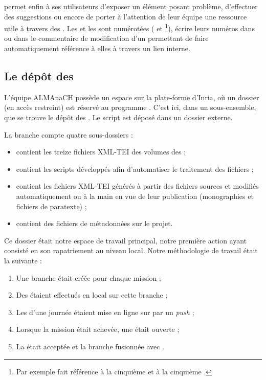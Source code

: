 \gitlab{} permet enfin à ses utilisateurs d'exposer un élément posant problème, d'effectuer des suggestions ou encore de porter à l'attention de leur équipe une ressource utile à travers des \issues. Les \issues{} et les \mergerequests{} sont numérotées ( et \footnote{Par exemple  fait référence à la cinquième \issue{} et  à la cinquième \mergerequest{}.}), écrire leurs numéros dans \gitlab{} ou dans le commentaire de modification d'un \commit{} permettant de faire automatiquement référence à elles à travers un lien interne.

\subsection{Le dépôt \gitlab{} des \odm}

L'équipe ALMAnaCH possède un espace sur la plate-forme \gitlab{} d'Inria, où un dossier (en accès restreint) est réservé au programme \timeus{}. C'est ici, dans un sous-ensemble, que se trouve le dépôt des \odm. Le script \lse{} est déposé dans un dossier externe.

La branche \master{} compte quatre sous-dossiers :

\begin{itemize}
    \item {} contient les treize fichiers XML-TEI des volumes des \odm{} ;
    \item {} contient les scripts développés afin d'automatiser le traitement des fichiers ;
    \item {} contient les fichiers XML-TEI générés à partir des fichiers sources et modifiés automatiquement ou à la main en vue de leur publication (monographies et fichiers de paratexte) ;
    \item {} contient des fichiers de métadonnées sur le projet.
\end{itemize}

Ce dossier était notre espace de travail principal, notre première action ayant consisté en son rapatriement au niveau local. Notre méthodologie de travail était la suivante :

\begin{enumerate}
    \item Une branche était créée pour chaque mission ;
    \item Des \commits{} étaient effectués en local sur cette branche ;
    \item Les \commits{} d'une journée étaient mise en ligne sur \gitlab{} par un \textit{push} ;
    \item Lorsque la mission était achevée, une \mergerequest{} était ouverte ;
    \item La \mergerequest{} était acceptée et la branche fusionnée avec \master.
\end{enumerate}

